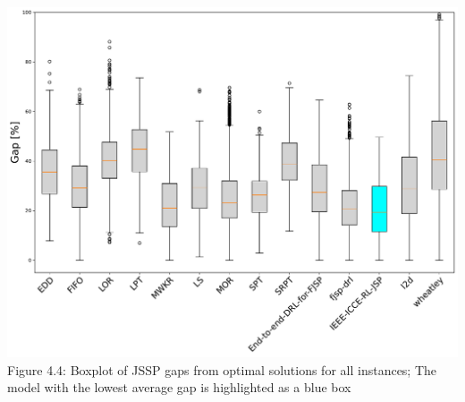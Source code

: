 \begin{center}
    \includegraphics[width=0.8\linewidth]{images/horizontal_boxplot_jssp_all.pdf}\\
    Figure 4.4: Boxplot of JSSP gaps from optimal solutions for all instances; The model with the lowest average gap is highlighted as a blue box
\end{center}


